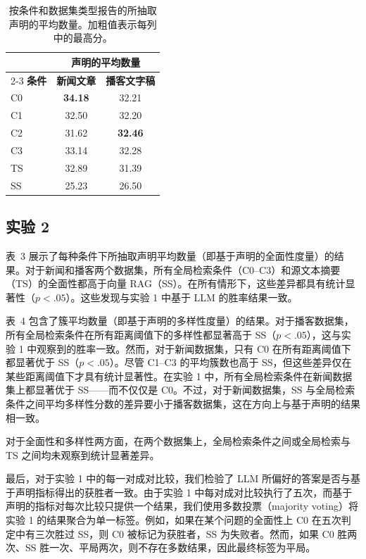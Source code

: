 \documentclass[11pt,UTF8,fontset=fandol]{ctexart}
\begin{document}
\begin{table}[H]\centering
\caption{按条件和数据集类型报告的所抽取声明的平均数量。加粗值表示每列中的最高分。}
\label{tab:3}
\small
\renewcommand{\arraystretch}{1.15}
\begin{tabular}{@{}lcc@{}}
\toprule
& \multicolumn{2}{c}{\textbf{声明的平均数量}} \\
\cmidrule(lr){2-3}
\textbf{条件} & \textbf{新闻文章} & \textbf{播客文字稿} \\
\midrule
C0 & \textbf{34.18} & 32.21 \\
C1 & 32.50 & 32.20 \\
C2 & 31.62 & \textbf{32.46} \\
C3 & 33.14 & 32.28 \\
TS & 32.89 & 31.39 \\
SS & 25.23 & 26.50 \\
\bottomrule
\end{tabular}
\end{table}

\subsection{实验 2}

表~3 展示了每种条件下所抽取声明平均数量（即基于声明的全面性度量）的结果。对于新闻和播客两个数据集，所有全局检索条件（C0--C3）和源文本摘要（TS）的全面性都高于向量 RAG（SS）。在所有情形下，这些差异都具有统计显著性（$p<.05$）。这些发现与实验 1 中基于 LLM 的胜率结果一致。

表~4 包含了簇平均数量（即基于声明的多样性度量）的结果。对于播客数据集，所有全局检索条件在所有距离阈值下的多样性都显著高于 SS（$p<.05$），这与实验 1 中观察到的胜率一致。然而，对于新闻数据集，只有 C0 在所有距离阈值下都显著优于 SS（$p<.05$）。尽管 C1--C3 的平均簇数也高于 SS，但这些差异仅在某些距离阈值下才具有统计显著性。在实验 1 中，所有全局检索条件在新闻数据集上都显著优于 SS——而不仅仅是 C0。不过，对于新闻数据集，SS 与全局检索条件之间平均多样性分数的差异要小于播客数据集，这在方向上与基于声明的结果相一致。

对于全面性和多样性两方面，在两个数据集上，全局检索条件之间或全局检索与 TS 之间均未观察到统计显著差异。

最后，对于实验 1 中的每一对成对比较，我们检验了 LLM 所偏好的答案是否与基于声明指标得出的获胜者一致。由于实验 1 中每对成对比较执行了五次，而基于声明的指标对每次比较只提供一个结果，我们使用多数投票（majority voting）将实验 1 的结果聚合为单一标签。例如，如果在某个问题的全面性上 C0 在五次判定中有三次胜过 SS，则 C0 被标记为获胜者，SS 为失败者。然而，如果 C0 胜两次、SS 胜一次、平局两次，则不存在多数结果，因此最终标签为平局。
\end{document}
